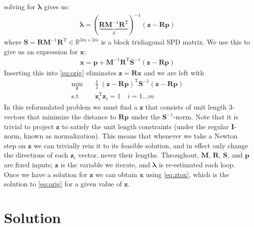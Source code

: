 \documentclass[14pt]{extarticle}
\newcommand*{\vv}[1]{\mathbf{#1}}
\newcommand{\T}{\text{T}}
\begin{document}
solving for $\vv \lambda$ gives us:
\begin{align*}
\vv \lambda = (\underbrace{\vv R \vv M^{-1} \vv R^{\T}}_{S})^{-1}
(\vv z-\vv{Rp})
\end{align*}
where $\vv S = \vv R \vv M^{-1} \vv R^{\T} \in \mathbb R^{3m \times 3m}$ is a
block tridiagonal SPD matrix. We use this to give us an expression for $\vv x$:
\begin{align}
\vv x = \vv p + \vv M^{-1}\vv R^{\T} \vv S^{-1}(\vv z - \vv R\vv p) \label{eq:ztox}
\end{align}
Inserting this into \eqref{eq:orig} eliminates $\mathbf z = \mathbf R \mathbf x
$ and we are left with
\begin{align}
\min_{\vv z} \quad &  \frac{1}{2} \; \vv{(z-Rp)}^{\T} \vv S^{-1} \vv
{(z-Rp)} \label{eq:main}\\
\text{s.t} \quad & \vv z_i^{\T}\vv z_i = 1 \quad i=1\dots m \nonumber
\end{align}
In this reformulated problem we must find a $\vv z$ that consists of unit length
3-vectors that minimize the distance to $\vv{Rp}$ under the $\vv S^{-1}$-norm.
Note that it is trivial to project $\vv z$ to satisfy the unit length
constraints (under the regular $\vv I$-norm, known as normalization).
This means that whenever we take a Newton step on $\vv z$ we can trivially rein
it to its feasible solution, and in effect only change the directions of
each $\vv z_i$ vector, never their lengths. Throughout, $\vv M$, $\vv R$,
$\vv S$, and $\vv p$ are fixed inputs; $\vv z$ is the variable we iterate, and
$\vv \lambda$ is re-estimated each loop. Once we have a solution for $\vv z$ we
can obtain $\vv x$ using \eqref{eq:ztox}, which is the solution to \eqref{eq:orig}
for a given value of $\vv z$. \section{Solution}
\end{document}
